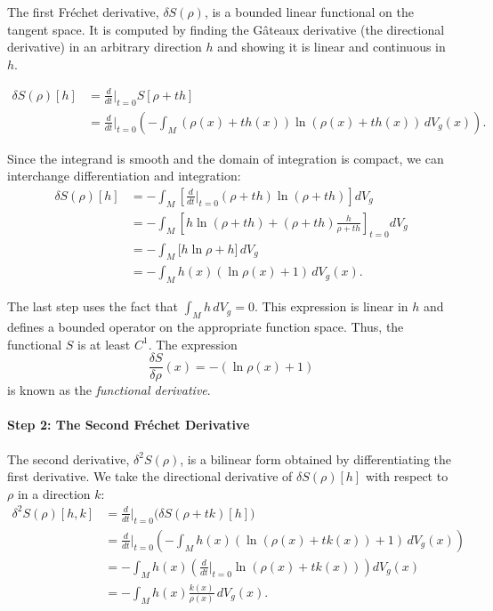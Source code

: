 \documentclass[12pt, a4paper]{article}
\begin{document}
The first Fréchet derivative, $\delta S(\rho)$, is a bounded linear functional on the tangent space. It is computed by finding the Gâteaux derivative (the directional derivative) in an arbitrary direction $h$ and showing it is linear and continuous in $h$.

\begin{align*}
\delta S(\rho)[h] &= \frac{d}{dt}\bigg|_{t=0} S[\rho + t h] \\
&= \frac{d}{dt}\bigg|_{t=0} \left( - \int_M (\rho(x) + t h(x)) \ln (\rho(x) + t h(x)) \, dV_g(x) \right).
\end{align*}

Since the integrand is smooth and the domain of integration is compact, we can interchange differentiation and integration:
\begin{align*}
\delta S(\rho)[h] &= - \int_M \left[ \frac{d}{dt}\bigg|_{t=0} (\rho + t h) \ln(\rho + t h) \right] dV_g \\
&= - \int_M \left[ h \ln(\rho + t h) + (\rho + t h) \frac{h}{\rho + t h} \right]_{t=0} dV_g \\
&= - \int_M \big[ h \ln \rho + h \big] \, dV_g \\
&= - \int_M h(x) (\ln \rho(x) + 1) \, dV_g(x).
\end{align*}

The last step uses the fact that $\int_M h \, dV_g = 0$. This expression is linear in $h$ and defines a bounded operator on the appropriate function space. Thus, the functional $S$ is at least $C^1$. The expression
\[
\frac{\delta S}{\delta \rho}(x) = -(\ln \rho(x) + 1)
\]
is known as the \emph{functional derivative}.

\paragraph{Step 2: The Second Fréchet Derivative}

The second derivative, $\delta^2 S(\rho)$, is a bilinear form obtained by differentiating the first derivative. We take the directional derivative of $\delta S(\rho)[h]$ with respect to $\rho$ in a direction $k$:
\begin{align*}
\delta^2 S(\rho)[h, k] &= \frac{d}{dt}\bigg|_{t=0} \big( \delta S(\rho + t k)[h] \big) \\
&= \frac{d}{dt}\bigg|_{t=0} \left( - \int_M h(x) (\ln (\rho(x) + t k(x)) + 1) \, dV_g(x) \right) \\
&= - \int_M h(x) \left( \frac{d}{dt}\bigg|_{t=0} \ln (\rho(x) + t k(x)) \right) dV_g(x) \\
&= - \int_M h(x) \frac{k(x)}{\rho(x)} \, dV_g(x).
\end{align*}
\end{document}
